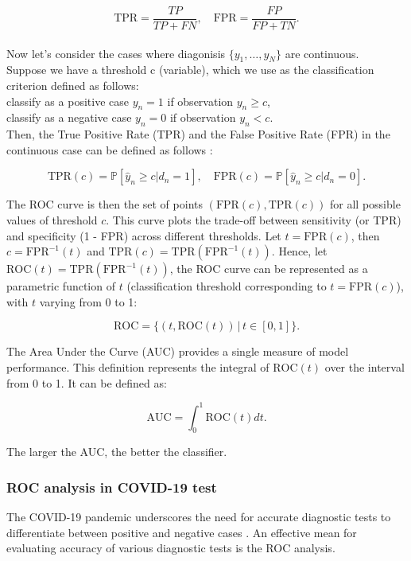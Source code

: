 \documentclass{article}\usepackage[]{graphicx}\usepackage[]{xcolor}
\numberwithin{equation}{section}
\begin{document}
\[\text{TPR} = \frac{TP}{TP+FN}, \quad \text{FPR} = \frac{FP}{FP+TN}.\]
\\
\noindent
Now let's consider the cases where diagonisis $\{y_1,\dots,y_N\}$ are continuous.\\

\noindent
Suppose we have a threshold c (variable), which we use as the classification criterion defined as follows: \\

\noindent
classify as a positive case $y_n = 1$ if observation $y_n \geq c$,\\
\noindent
classify as a negative case $y_n = 0$ if observation $y_n < c$.\\

\noindent
Then, the True Positive Rate (TPR) and the False Positive Rate (FPR) in the continuous case can be defined as follows \cite{Pepe2003}:


\[\text{TPR}(c) = \mathbb{P}[\hat{y}_n \geq c | d_n = 1], \quad \text{FPR}(c) = \mathbb{P}[\hat{y}_n \geq c | d_n = 0].\]

\noindent
The ROC curve is then the set of points $(\text{FPR}(c), \text{TPR}(c))$ for all possible values of threshold $c$. This curve plots the trade-off between sensitivity (or TPR) and specificity (1 - FPR) across different thresholds. Let $t=\text{FPR}(c)$, then $c = \text{FPR}^{-1}(t)$ and $\text{TPR}(c)= \text{TPR}(\text{FPR}^{-1}(t))$. Hence, let $\text{ROC}(t)= \text{TPR}(\text{FPR}^{-1}(t))$, the ROC curve can be represented as a parametric function of $t$ (classification threshold corresponding to $t=\text{FPR}(c)$), with $t$ varying from 0 to 1:

\[ \text{ROC} = \{ (t, \text{ROC}(t)) \,|\, t \in [0, 1] \}.\]

\noindent
The Area Under the Curve (AUC) provides a single measure of model performance. This definition represents the integral of $\text{ROC}(t)$ over the interval from 0 to 1. It can be defined as:

\[ \text{AUC} = \int_{0}^{1} \text{ROC}(t) dt.\]

\noindent
The larger the AUC, the better the classifier.

\subsubsection{ROC analysis in COVID-19 test}

The COVID-19 pandemic underscores the need for accurate diagnostic tests to differentiate between positive and negative cases \cite{Garcia2021ROCAlly}. An effective mean for evaluating accuracy of various diagnostic tests is the ROC analysis.\\
\end{document}
